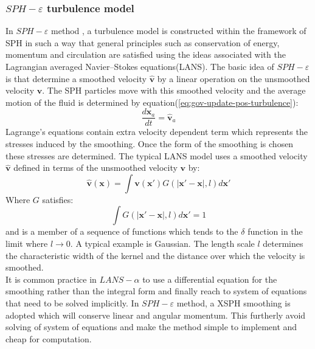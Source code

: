 \documentclass[10pt,a4paper]{article}
\begin{document}
\subsubsection{$SPH-\varepsilon$ turbulence model}
In $SPH-\varepsilon$ method \cite{monaghan2011turbulence}, a turbulence model is constructed within the framework of SPH in such a way that general principles such as conservation of energy, momentum and circulation are satisfied using the ideas associated with the Lagrangian averaged Navier–Stokes equations(LANS). The basic idea of $SPH-\varepsilon$ is that determine a smoothed velocity $\widehat{\textbf{v}}$ by a linear operation on the unsmoothed velocity $\textbf{v}$. The SPH particles move with this smoothed velocity and the average motion of the fluid is determined by equation(\ref{eq:gov-update-pos-turbulence}):
\begin{equation}
\dfrac{d \textbf{x}_a}{dt} = \widehat{\textbf{v}}_a \label{eq:gov-update-pos-turbulence}
\end{equation}
Lagrange’s equations contain extra velocity dependent term which represents the stresses induced by the smoothing. Once the form of the smoothing is chosen these stresses are determined. 
The typical LANS model uses a smoothed velocity $\widehat{\textbf{v}}$ 
defined in terms of the unsmoothed velocity $\textbf{v}$ by:
\begin{equation}
\widehat{\textbf{v}}(\textbf{x})=\int \textbf{v}(\textbf{x} \prime)G(\vert \textbf{x} \prime - \textbf{x} \vert, l) d\textbf{x} \prime
\end{equation}
Where $G$ satisfies:
\begin{equation}
\int G(\vert \textbf{x} \prime - \textbf{x} \vert, l) d\textbf{x} \prime =1
\end{equation}
and is a member of a sequence of functions which tends to the $\delta$ function in the limit where $ l\rightarrow 0$. A typical example is Gaussian.
The length scale $l$ determines the characteristic width of the kernel and the distance over which the velocity is smoothed.\\
It is common practice in $LANS-\alpha$ to use a differential equation for the smoothing rather than the integral form and finally reach to system of equations that need to be solved implicitly. In $SPH-\varepsilon$ method, a XSPH smoothing is adopted which will conserve linear and angular momentum. This furtherly avoid solving of system of equations and make the method simple to implement and cheap for computation. 
\end{document}
